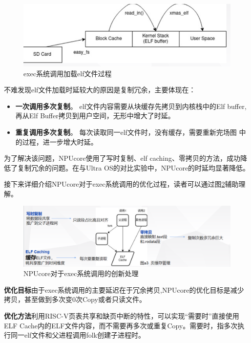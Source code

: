 \begin{figure}[htbp]
	\centering
	\includegraphics[scale=0.75]{figures/10-04/10-04-02.png}
	\caption{exec系统调用加载elf文件过程}
	\label{exam-2}
\end{figure}

不难发现elf文件加载时延较大的原因是复制冗余，主要体现在：
\begin{itemize}
	\item \textbf{一次调用多次复制}。 elf文件内容需要从块缓存先拷贝到内核栈中的Elf buffer,再从Elf Buffer拷贝到用户空间，无形中增大了时延。
	
	\item \textbf{重复调用多次复制}。 每次读取同一elf文件时，没有缓存，需要重新完场图 中的过程，进一步增大时延。
\end{itemize}

为了解决该问题，NPUcore使用了写时复制、elf caching、零拷贝的方法，成功降低了复制冗余的问题。在与Ultra OS的对比实验中，NPUcore的时延均显著降低。

接下来详细介绍NPUcore对于exec系统调用的优化过程，读者可以通过图\ref{exam-3}辅助理解。

\begin{figure}[htbp]
	\centering
	\includegraphics[scale=0.5]{figures/10-04/10-04-03.png}
	\caption{NPUcore对于exec系统调用的创新处理}
	\label{exam-3}
\end{figure}

\textbf{优化目标}\;由于exec系统调用的主要延迟在于冗余拷贝,NPUcore的优化目标是减少拷贝，甚至做到多次变0次Copy或者只读文件。

\textbf{优化方法}\;利用RISC-V页表共享和缺页中断的特性，可以实现“需要时”直接使用ELF Cache内的ELF文件内容，而不需要再多次或重复Copy。需要时，指多次执行同一elf文件和父进程调用folk创建子进程时。

